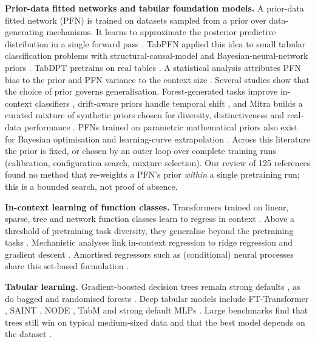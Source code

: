 \documentclass[mathematics,article,submit,pdftex,moreauthors]{Definitions/mdpi}
\begin{document}
\textbf{Prior-data fitted networks and tabular foundation models.} A prior-data fitted network (PFN) is trained on datasets sampled from a prior over data-generating mechanisms. It learns to approximate the posterior predictive distribution in a single forward pass \cite{muller2022transformers}. TabPFN applied this idea to small tabular classification problems with structural-causal-model and Bayesian-neural-network priors \cite{hollmann2023tabpfn}. TabDPT pretrains on real tables \cite{ma2024tabdpt}. A statistical analysis attributes PFN bias to the prior and PFN variance to the context size \cite{nagler2023statistical}. Several studies show that the choice of prior governs generalisation. Forest-generated tasks improve in-context classifiers \cite{breejen2024fine}, drift-aware priors handle temporal shift \cite{helli2024drift}, and Mitra builds a curated mixture of synthetic priors chosen for diversity, distinctiveness and real-data performance \cite{zhang2025mitra}. PFNs trained on parametric mathematical priors also exist for Bayesian optimisation and learning-curve extrapolation \cite{muller2023pfns4bo,adriaensen2023efficient}. Across this literature the prior is fixed, or chosen by an outer loop over complete training runs (calibration, configuration search, mixture selection). Our review of 125 references found no method that re-weights a PFN's prior \emph{within} a single pretraining run; this is a bounded search, not proof of absence.

\textbf{In-context learning of function classes.} Transformers trained on linear, sparse, tree and network function classes learn to regress in context \cite{garg2022what}. Above a threshold of pretraining task diversity, they generalise beyond the pretraining tasks \cite{raventos2023pretraining}. Mechanistic analyses link in-context regression to ridge regression and gradient descent \cite{akyurek2023what,vonoswald2023transformers}. Amortised regressors such as (conditional) neural processes share this set-based formulation \cite{garnelo2018neural,garnelo2018conditional,zaheer2017deep,lee2019set}.

\textbf{Tabular learning.} Gradient-boosted decision trees remain strong defaults \cite{chen2016xgboost,ke2017lightgbm,prokhorenkova2018catboost,friedman2001greedy}, as do bagged and randomised forests \cite{breiman2001random,geurts2006extremely}. Deep tabular models include FT-Transformer \cite{gorishniy2021revisiting}, SAINT \cite{somepalli2021saint}, NODE \cite{popov2020neural}, TabM \cite{gorishniy2025tabm} and strong default MLPs \cite{holzmuller2024better}. Large benchmarks find that trees still win on typical medium-sized data \cite{grinsztajn2022why,shwartzziv2022tabular} and that the best model depends on the dataset \cite{mcelfresh2023when}.
\end{document}

